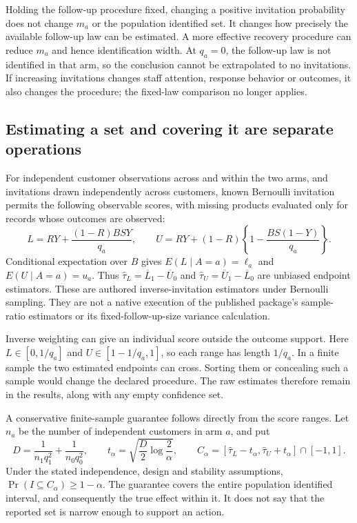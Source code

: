Holding the follow-up procedure fixed, changing a positive invitation
probability does not change $m_a$ or the population identified set. It
changes how precisely the available follow-up law can be estimated. A more
effective recovery procedure can reduce $m_a$ and hence identification width.
At $q_a=0$, the follow-up law is not identified in that arm, so the conclusion
cannot be extrapolated to no invitations. If increasing invitations changes
staff attention, response behavior or outcomes, it also changes the procedure;
the fixed-law comparison no longer applies.

\subsection{Estimating a set and covering it are separate operations}

For independent customer observations across and within the two arms,
and invitations drawn independently across customers, known Bernoulli
invitation permits
the following observable scores, with missing products evaluated only for
records whose outcomes are observed:
\begin{equation}
 L=RY+\frac{(1-R)BSY}{q_a},\qquad
 U=RY+(1-R)\left\{1-\frac{BS(1-Y)}{q_a}\right\}.
 \label{rel73:endpoint-scores}
\end{equation}
Conditional expectation over $B$ gives $E(L\mid A=a)=\ell_a$ and
$E(U\mid A=a)=u_a$. Thus
$\widehat\tau_L=\overline L_1-\overline U_0$ and
$\widehat\tau_U=\overline U_1-\overline L_0$ are unbiased endpoint
estimators. These are authored inverse-invitation estimators under Bernoulli
sampling. They are not a native execution of the published package's
sample-ratio estimators or its fixed-follow-up-size variance calculation.

Inverse weighting can give an individual score outside the outcome support.
Here $L\in[0,1/q_a]$ and $U\in[1-1/q_a,1]$, so each range has length
$1/q_a$. In a finite sample the two estimated endpoints can cross. Sorting
them or concealing such a sample would change the declared procedure. The
raw estimates therefore remain in the results, along with any empty
confidence set.

A conservative finite-sample guarantee follows directly from the score
ranges. Let $n_a$ be the number of independent customers in arm $a$, and put
\begin{equation}
 D=\frac{1}{n_1q_1^2}+\frac{1}{n_0q_0^2},\qquad
 t_\alpha=\sqrt{\frac{D}{2}\log\frac{2}{\alpha}},\qquad
 C_\alpha=[\widehat\tau_L-t_\alpha,
            \widehat\tau_U+t_\alpha]\cap[-1,1].
 \label{rel73:confidence-set}
\end{equation}
Under the stated independence, design and stability assumptions,
$\Pr(I\subseteq C_\alpha)\geq1-\alpha$. The guarantee covers the entire
population identified interval, and consequently the true effect within it.
It does not say that the reported set is narrow enough to support an action.


